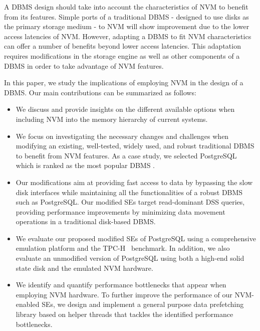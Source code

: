 A DBMS design should take into account the characteristics of NVM to benefit from its features. Simple ports of a traditional DBMS - designed to use disks as the primary storage medium - to 
NVM will show improvement due to the lower access latencies of NVM. However, adapting a DBMS to fit NVM characteristics can offer a number of benefits beyond lower access latencies. This adaptation requires modifications in the storage engine as well as other components of a DBMS \cite{arulraj2017build} in order to take advantage of NVM features.

In this paper, we study the implications of employing NVM in the design of a DBMS. Our main contributions can be summarized as follows:
\begin{itemize}%
 \item We discuss and provide insights on the different available options when including NVM into the memory hierarchy of current systems.
 
 \item We focus on investigating the necessary changes and challenges when modifying an existing, well-tested, widely used, and robust traditional DBMS to benefit from NVM features. As a case study, we selected PostgreSQL which is ranked as the  most popular DBMS \cite{DBRanking}.
 
 \item %
 Our modifications aim at providing fast access to data by bypassing the slow disk interfaces while maintaining all the functionalities of a robust DBMS such as PostgreSQL. Our modified SEs target read-dominant DSS queries, providing performance improvements by minimizing data movement operations in a traditional disk-based DBMS.
 
 \item We evaluate our proposed modified SEs of PostgreSQL using a comprehensive emulation platform and the TPC-H~\cite{council2008tpc} benchmark. In addition, we also evaluate an unmodified version of PostgreSQL using both a high-end solid state disk and the emulated NVM hardware.
 
 \item We identify and quantify performance bottlenecks that appear when employing NVM hardware. To further improve the performance of our NVM-enabled SEs, we design and implement a general purpose data prefetching library based on helper threads that tackles the identified performance bottlenecks.
\end{itemize}

